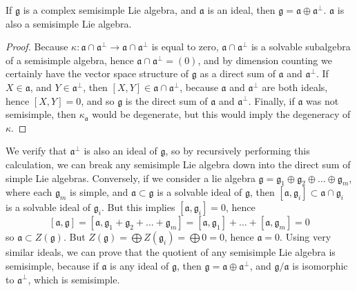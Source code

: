 \begin{lemma}
    If $\mathfrak{g}$ is a complex semisimple Lie algebra, and $\mathfrak{a}$ is an ideal, then $\mathfrak{g} = \mathfrak{a} \oplus \mathfrak{a}^\perp$. $\mathfrak{a}$ is also a semisimple Lie algebra.
\end{lemma}
\begin{proof}
    Because $\kappa: \mathfrak{a} \cap \mathfrak{a}^\perp \to \mathfrak{a} \cap \mathfrak{a}^\perp$ is equal to zero, $\mathfrak{a} \cap \mathfrak{a}^\perp$ is a solvable subalgebra of a semisimple algebra, hence $\mathfrak{a} \cap \mathfrak{a}^\perp = (0)$, and by dimension counting we certainly have the vector space structure of $\mathfrak{g}$ as a direct sum of $\mathfrak{a}$ and $\mathfrak{a}^\perp$. If $X \in \mathfrak{a}$, and $Y \in \mathfrak{a}^\perp$, then $[X,Y] \in \mathfrak{a} \cap \mathfrak{a}^\perp$, because $\mathfrak{a}$ and $\mathfrak{a}^\perp$ are both ideals, hence $[X,Y] = 0$, and so $\mathfrak{g}$ is the direct sum of $\mathfrak{a}$ and $\mathfrak{a}^\perp$. Finally, if $\mathfrak{a}$ was not semisimple, then $\kappa_\mathfrak{a}$ would be degenerate, but this would imply the degeneracy of $\kappa$.
\end{proof}

We verify that $\mathfrak{a}^\perp$ is also an ideal of $\mathfrak{g}$, so by recursively performing this calculation, we can break any semisimple Lie algebra down into the direct sum of simple Lie algebras. Conversely, if we consider a lie algebra $\mathfrak{g} = \mathfrak{g}_1 \oplus \mathfrak{g}_2 \oplus \dots \oplus \mathfrak{g}_m$, where each $\mathfrak{g}_m$ is simple, and $\mathfrak{a} \subset \mathfrak{g}$ is a solvable ideal of $\mathfrak{g}$, then $[\mathfrak{a}, \mathfrak{g}_i] \subset \mathfrak{a} \cap \mathfrak{g}_i$ is a solvable ideal of $\mathfrak{g}_i$. But this implies $[\mathfrak{a}, \mathfrak{g}_i] = 0$, hence
%
\[ [\mathfrak{a}, \mathfrak{g}] = [\mathfrak{a}, \mathfrak{g}_1 + \mathfrak{g}_2 + \dots + \mathfrak{g}_m] = [\mathfrak{a}, \mathfrak{g}_1] + \dots + [\mathfrak{a}, \mathfrak{g}_m] = 0 \]
%
so $\mathfrak{a} \subset Z(\mathfrak{g})$. But $Z(\mathfrak{g}) = \bigoplus Z(\mathfrak{g}_i) = \bigoplus 0 = 0$, hence $\mathfrak{a} = 0$. Using very similar ideals, we can prove that the quotient of any semisimple Lie algebra is semisimple, because if $\mathfrak{a}$ is any ideal of $\mathfrak{g}$, then $\mathfrak{g} = \mathfrak{a} \oplus \mathfrak{a}^\perp$, and $\mathfrak{g}/\mathfrak{a}$ is isomorphic to $\mathfrak{a}^\perp$, which is semisimple.

